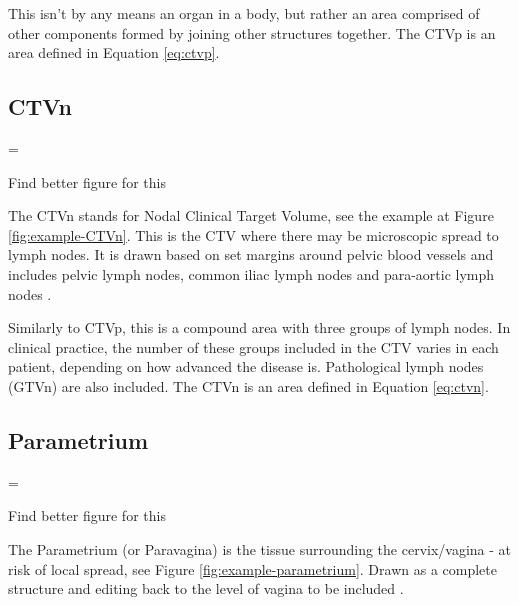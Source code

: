 \documentclass[11pt,twoside]{report}
\newenvironment{warning}
  {\par\begin{mdframed}[linewidth=1pt,linecolor=black]%
    \begin{list}{}{\leftmargin=1cm
                   \labelwidth=\leftmargin}\item[\Large\ding{43}]}
  {\end{list}\end{mdframed}\par}
\begin{document}
This isn't by any means an organ in a body, but rather an area comprised of other components formed by joining other structures together. The CTVp is an area defined in Equation \ref{eq:ctvp}.

\subsection{CTVn}\label{sec:data-CTVn}

\begin{warning}
  Find better figure for this
\end{warning}


The CTVn stands for Nodal Clinical Target Volume, see the example at Figure \ref{fig:example-CTVn}. This is the CTV where there may be microscopic spread to lymph nodes. It is drawn based on set margins around pelvic blood vessels and includes pelvic lymph nodes, common iliac lymph nodes and para-aortic lymph nodes \cite{AMLART-data}. 

Similarly to CTVp, this is a compound area with three groups of lymph nodes. In clinical practice, the number of these groups included in the CTV varies in each patient, depending on how advanced the disease is. Pathological lymph nodes (GTVn) are also included. The CTVn is an area defined in Equation \ref{eq:ctvn}.

\subsection{Parametrium}\label{sec:data-Parametrium}

\begin{warning}
  Find better figure for this
\end{warning}


The Parametrium (or Paravagina) is the tissue surrounding the cervix/vagina - at risk of local spread, see Figure \ref{fig:example-parametrium}. Drawn as a complete structure and editing back to the level of vagina to be included \cite{AMLART-data}.
\end{document}
